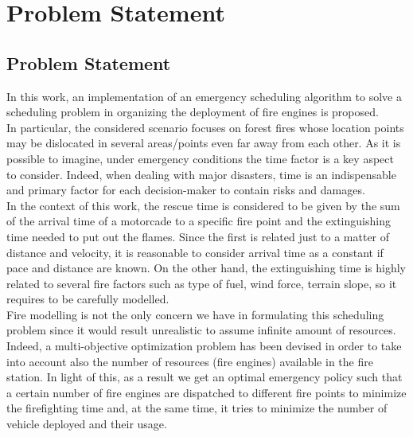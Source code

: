 \section{Problem Statement}
\subsection{Problem Statement}
In this work, an implementation of an emergency scheduling algorithm to solve a scheduling problem in organizing the deployment of fire engines is proposed. \\
In particular, the considered scenario focuses on forest fires whose location points may be dislocated in several areas/points even far away from each other.
As it is possible to imagine, under emergency conditions the time factor is a key aspect to consider. Indeed, when dealing with major disasters, time is an indispensable and primary factor for each decision-maker to contain risks and damages.\\

In the context of this work, the rescue time is considered to be given by the sum of the arrival time of a motorcade to a specific fire point and the extinguishing time needed to put out the flames. Since the first is related just to a matter of distance and velocity, it is reasonable to consider arrival time as a constant if pace and distance are known.
On the other hand, the extinguishing time is highly related to several fire factors such as type of fuel, wind force, terrain slope, so it requires to be carefully modelled. \\

Fire modelling is not the only concern we have in formulating this scheduling problem since it would result unrealistic to assume infinite amount of resources. Indeed, a multi-objective optimization problem has been devised in order to take into account also the number of resources (fire engines) available in the fire station.
In light of this, as a result we get an optimal emergency policy such that a certain number of fire engines are dispatched to different fire points to minimize the firefighting time and, at the same time, it tries to minimize the number of vehicle deployed and their usage. 

